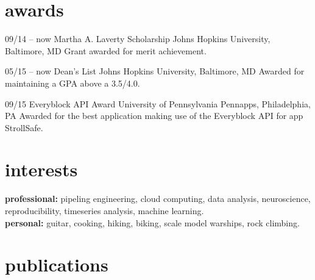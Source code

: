\documentclass[]{friggeri-cv} %
\begin{document}

\section{awards}

\begin{entrylist}
\entry
{09/14 -- now}
{Martha A. Laverty Scholarship}
{Johns Hopkins University, Baltimore, MD}
{Grant awarded for merit achievement.}

\entry
{05/15 -- now}
{Dean's List}
{Johns Hopkins University, Baltimore, MD}
{Awarded for maintaining a GPA above a 3.5/4.0.}

\entry
{09/15}
{Everyblock API Award}
{University of Pennsylvania Pennapps, Philadelphia, PA}
{Awarded for the best application making use of the Everyblock API for app StrollSafe.}

\end{entrylist}


\newpage
\section{interests}

\textbf{professional:} pipeling engineering, cloud computing, data analysis, neuroscience, reproducibility, timeseries analysis, machine learning.\\
\textbf{personal:} guitar, cooking, hiking, biking, scale model warships, rock climbing.


\section{publications}





\end{document}
